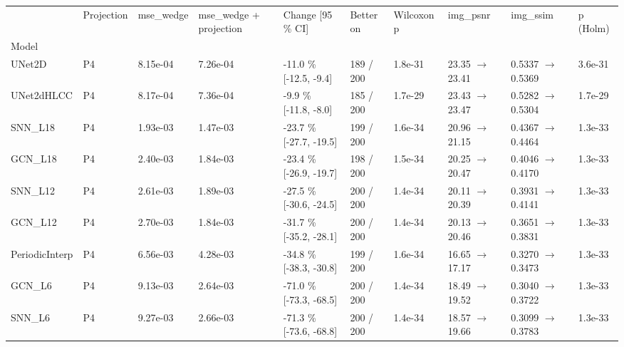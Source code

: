 \begin{tabular}{llllllllll}
\toprule
 & Projection & mse\_wedge & mse\_wedge + projection & Change [95 \% CI] & Better on & Wilcoxon p & img\_psnr & img\_ssim & p (Holm) \\
Model &  &  &  &  &  &  &  &  &  \\
\midrule
UNet2D & P4 & 8.15e-04 & 7.26e-04 & -11.0 \% [-12.5, -9.4] & 189 / 200 & 1.8e-31 & 23.35 $\rightarrow$ 23.41 & 0.5337 $\rightarrow$ 0.5369 & 3.6e-31 \\
UNet2dHLCC & P4 & 8.17e-04 & 7.36e-04 & -9.9 \% [-11.8, -8.0] & 185 / 200 & 1.7e-29 & 23.43 $\rightarrow$ 23.47 & 0.5282 $\rightarrow$ 0.5304 & 1.7e-29 \\
SNN\_L18 & P4 & 1.93e-03 & 1.47e-03 & -23.7 \% [-27.7, -19.5] & 199 / 200 & 1.6e-34 & 20.96 $\rightarrow$ 21.15 & 0.4367 $\rightarrow$ 0.4464 & 1.3e-33 \\
GCN\_L18 & P4 & 2.40e-03 & 1.84e-03 & -23.4 \% [-26.9, -19.7] & 198 / 200 & 1.5e-34 & 20.25 $\rightarrow$ 20.47 & 0.4046 $\rightarrow$ 0.4170 & 1.3e-33 \\
SNN\_L12 & P4 & 2.61e-03 & 1.89e-03 & -27.5 \% [-30.6, -24.5] & 200 / 200 & 1.4e-34 & 20.11 $\rightarrow$ 20.39 & 0.3931 $\rightarrow$ 0.4141 & 1.3e-33 \\
GCN\_L12 & P4 & 2.70e-03 & 1.84e-03 & -31.7 \% [-35.2, -28.1] & 200 / 200 & 1.4e-34 & 20.13 $\rightarrow$ 20.46 & 0.3651 $\rightarrow$ 0.3831 & 1.3e-33 \\
PeriodicInterp & P4 & 6.56e-03 & 4.28e-03 & -34.8 \% [-38.3, -30.8] & 199 / 200 & 1.6e-34 & 16.65 $\rightarrow$ 17.17 & 0.3270 $\rightarrow$ 0.3473 & 1.3e-33 \\
GCN\_L6 & P4 & 9.13e-03 & 2.64e-03 & -71.0 \% [-73.3, -68.5] & 200 / 200 & 1.4e-34 & 18.49 $\rightarrow$ 19.52 & 0.3040 $\rightarrow$ 0.3722 & 1.3e-33 \\
SNN\_L6 & P4 & 9.27e-03 & 2.66e-03 & -71.3 \% [-73.6, -68.8] & 200 / 200 & 1.4e-34 & 18.57 $\rightarrow$ 19.66 & 0.3099 $\rightarrow$ 0.3783 & 1.3e-33 \\
\bottomrule
\end{tabular}

